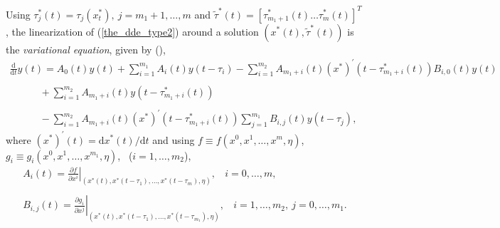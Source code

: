 \documentclass[10pt]{article}
\gdef \define#1{{\em{#1}}}
\gdef \d{{\mathrm d}}
\begin{document}
Using $\tau_j^*(t)=\tau_j(x_t^*),~j=m_1+1,\ldots,m$ and
$\tilde{\tau}^*(t)=[\tau_{m_1+1}^*(t) \ldots \tau_m^*(t)]^T$,
the linearization of (\ref{the_dde_type2}) around a solution 
$(x^*(t),\tilde{\tau}^*(t))$ 
is the \define{variational equation}, given by (\cite{Hartung97}),
\begin{equation}\label{the_var_equa2}
\begin{array}{l}
\frac{\d}{\d t}{y(t)}=A_0(t)y(t) +\sum_{i=1}^{m_1} A_i(t)y(t-\tau_i) -\sum_{i=1}^{m_2}A_{m_1+i}(t)(x^*)^{'}(t-\tau_{m_1+i}^*(t))B_{i,0}(t)y(t)\\ \\
\quad \quad \quad +
\sum_{i=1}^{m_2} A_{m_1+i}(t)y(t-\tau_{m_1+i}^*(t))\\ \\
\quad \quad \quad -\sum_{i=1}^{m_2}A_{m_1+i}(t)(x^*)^{'}(t-\tau_{m_1+i}^*(t))\sum_{j=1}^{m_1}B_{i,j}(t)y(t-\tau_j),
\end{array}
\end{equation}
where $(x^*)^{'}(t)={\d}x^*(t)/{\d}t$ and 
using $f\equiv f(x^0,x^1,\ldots,x^m,\eta)$,  
$g_i\equiv g_i(x^0,x^1,\ldots,x^{m_1},\eta)$,~
($i=1,\ldots,m_2$),
\begin{equation}\label{A_def2}
\begin{array}{l}
A_i(t)=\left.\frac{\partial f}{\partial x^i}
\right|_{(x^*(t),x^*(t-\tau_1),\ldots,x^*(t-\tau_m),\eta)},\: \: \: \: 
i=0,\ldots,m,\\ \\
B_{i,j}(t)=\left.\frac{\partial g_i}{\partial x^j}
\right|_{(x^*(t),x^*(t-\tau_1),\ldots,x^*(t-\tau_{m_1}),\eta)}, \: \: \: \:
i=1,\ldots,m_2, \: j=0,\ldots,m_1. 
\end{array}
\end{equation}
\end{document}
